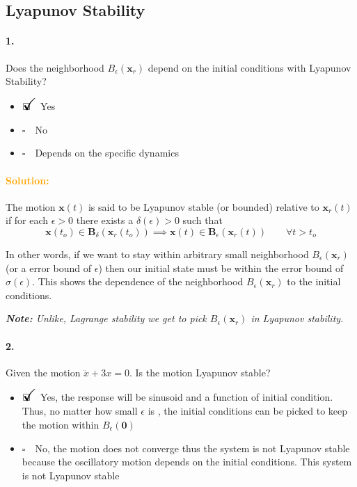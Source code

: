 \documentclass[12pt, a4paper]{article}
\newcommand{\ans}{\item[]$\rlap{\LARGE{\checkmark}}\square\quad$}
\newcommand{\noans}{\item[]$\square\quad$}
\begin{document}
\newpage
\subsection{Lyapunov Stability}
\paragraph{1.}
Does the neighborhood $B_{\epsilon}(\bm{x}_{r})$ depend on the initial conditions with Lyapunov Stability?

\begin{itemize}
\ans Yes
\noans No
\noans Depends on the specific dynamics
\end{itemize}

\paragraph{\textcolor{orange}{Solution:}}
The motion $\bm{x}(t)$ is said to be Lyapunov stable (or bounded) relative to $\bm{x}_{r}(t)$ if for each $\epsilon>0$ there exists a $\delta(\epsilon) > 0$ such that
$$\bm{x}(t_{o}) \in \bm{B}_{\delta}(\bm{x}_{r}(t_{o})) \implies \bm{x}(t) \in \bm{B}_{\epsilon}(\bm{x}_{r}(t)) \quad \quad \forall t > t_{o}$$

In other words, if we want to stay within arbitrary small neighborhood $B_{\epsilon}(\bm{x}_{r})$ (or a error bound of $\epsilon$) then our initial state must be within the error bound of $\sigma(\epsilon)$. This shows the dependence of the neighborhood $B_{\epsilon}(\bm{x}_{r})$ to the initial conditions. \medskip

\textit{\textbf{Note:} Unlike, Lagrange stability we get to pick $B_{\epsilon}(\bm{x}_{r})$ in Lyapunov stability.} 
 
\paragraph{2.} Given the motion $\ddot{x} + 3 x = 0$. Is the motion Lyapunov stable?

\begin{itemize}
\ans Yes, the response will be sinusoid and a function of initial condition. Thus, no matter how small $\epsilon$ is , the initial conditions can be picked to keep the motion within $B_{\epsilon}(\bm{0})$
\noans No, the motion does not converge thus the system is not Lyapunov stable because the oscillatory motion depends on the initial conditions. This system is not Lyapunov stable
\end{itemize}
\end{document}
